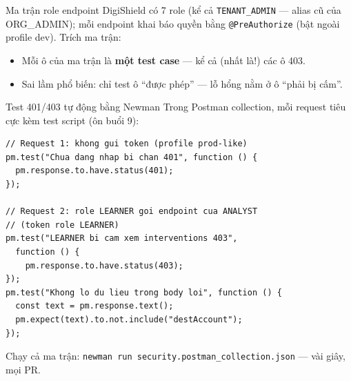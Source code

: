 \documentclass[aspectratio=169,12pt]{beamer}
\begin{document}
\begin{frame}{Ma trận role \texttimes{} endpoint}
  \small DigiShield có 7 role (kể cả \texttt{TENANT\_ADMIN} --- alias cũ của ORG\_ADMIN); mỗi endpoint khai báo quyền bằng \texttt{@PreAuthorize} (bật ngoài profile dev). Trích ma trận:
  \begin{table}
    \small
  \end{table}
  \begin{itemize}
    \item Mỗi ô của ma trận là \textbf{một test case} --- kể cả (nhất là!) các ô 403.
    \item Sai lầm phổ biến: chỉ test ô ``được phép'' --- lỗ hổng nằm ở ô ``phải bị cấm''.
  \end{itemize}
\end{frame}

\begin{frame}[fragile]{Test 401/403 tự động bằng Newman}
  \small Trong Postman collection, mỗi request tiêu cực kèm test script (ôn buổi 9):
\begin{lstlisting}[basicstyle=\ttfamily\scriptsize]
// Request 1: khong gui token (profile prod-like)
pm.test("Chua dang nhap bi chan 401", function () {
  pm.response.to.have.status(401);
});

// Request 2: role LEARNER goi endpoint cua ANALYST
// (token role LEARNER)
pm.test("LEARNER bi cam xem interventions 403",
  function () {
    pm.response.to.have.status(403);
});
pm.test("Khong lo du lieu trong body loi", function () {
  const text = pm.response.text();
  pm.expect(text).to.not.include("destAccount");
});
\end{lstlisting}
  \small Chạy cả ma trận: \texttt{newman run security.postman\_collection.json} --- vài giây, mọi PR.
\end{frame}
\end{document}
